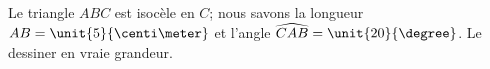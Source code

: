 
\begin{exercice}\label{exosmath-0776}

    Le triangle \( ABC\) est isocèle en \( C\); nous savons la longueur \( AB=\unit{5}{\centi\meter}\) et l'angle \( \widehat{CAB}=\unit{20}{\degree}\). Le dessiner en vraie grandeur.

\end{exercice}
